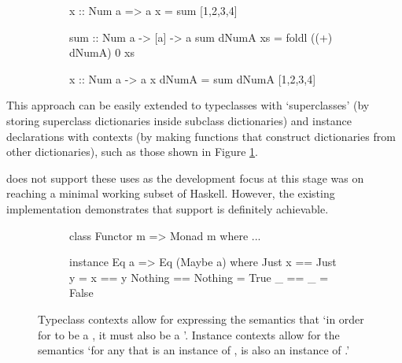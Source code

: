 \documentclass[dissertation.tex]{subfiles}
\begin{document}
{{{\begin{enumerate}
{\begin{figure}[H]
\begin{subfigure}[t]{0.30\textwidth}
\begin{haskellfigure}
                x :: Num a => a
                x = sum [1,2,3,4]
                \end{haskellfigure}
                \end{subfigure}
                \hspace{5mm}
                \begin{subfigure}[t]{0.45\textwidth}
                \begin{haskellfigure}
                sum :: Num a -> [a] -> a
                sum dNumA xs = foldl ((+) dNumA) 0 xs

                x :: Num a -> a
                x dNumA = sum dNumA [1,2,3,4]
                \end{haskellfigure}
                \end{subfigure}
                \end{figure}
            }
            \end{enumerate}

            This approach can be easily extended to typeclasses with `superclasses' (by storing superclass dictionaries inside subclass dictionaries) and instance declarations with contexts (by making functions that construct dictionaries from other dictionaries), such as those shown in Figure \ref{fig:instance-context}. 

            \compilername does not support these uses as the development focus at this stage was on reaching a minimal working subset of Haskell. However, the existing implementation demonstrates that support is definitely achievable.

            \begin{figure}[h]
            \centering
            \begin{subfigure}[t]{0.40\textwidth}
            \begin{haskellfigure}
            class Functor m => Monad m where
                ...
            \end{haskellfigure}
            \end{subfigure}
            \hspace{5mm}
            \begin{subfigure}[t]{0.40\textwidth}
            \begin{haskellfigure}
            instance Eq a => Eq (Maybe a) where
                Just x == Just y = x == y
                Nothing == Nothing = True
                _ == _ = False
            \end{haskellfigure}
            \end{subfigure}
            \caption{Typeclass contexts allow for expressing the semantics that `in order for  to be a , it must also be a '. Instance contexts allow for the semantics `for any  that is an instance of ,  is also an instance of .'}
            \label{fig:instance-context}
            \end{figure}
        }
    }
}
\end{document}
